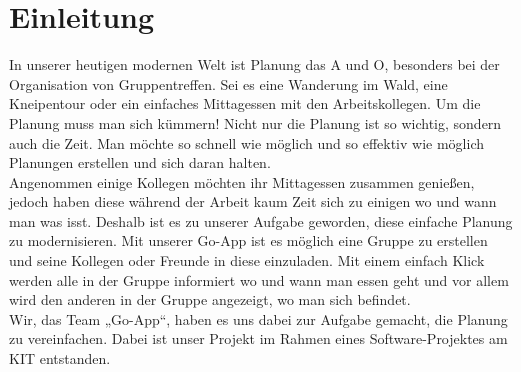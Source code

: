\section{Einleitung}
In unserer heutigen modernen Welt ist Planung das A und O, besonders bei der Organisation von Gruppentreffen. Sei es eine Wanderung im Wald, eine Kneipentour oder ein einfaches Mittagessen mit den Arbeitskollegen. Um die Planung muss man sich kümmern! Nicht nur die Planung ist so wichtig, sondern auch die Zeit. Man möchte so schnell wie möglich und so effektiv wie möglich Planungen erstellen und sich daran halten. \\
Angenommen einige Kollegen möchten ihr Mittagessen zusammen genießen, jedoch haben diese während der Arbeit kaum Zeit sich zu einigen wo  und wann man was isst. Deshalb ist es zu unserer Aufgabe geworden, diese einfache Planung zu modernisieren. Mit unserer Go-App ist es möglich eine Gruppe zu erstellen und seine Kollegen oder Freunde in diese einzuladen. Mit einem einfach Klick werden alle in der Gruppe informiert wo und wann man essen geht und vor allem wird den anderen in der Gruppe angezeigt, wo man sich befindet. \\
Wir, das Team „Go-App“, haben es uns dabei zur Aufgabe gemacht, die Planung zu vereinfachen. Dabei ist unser Projekt im Rahmen eines Software-Projektes am KIT entstanden. \\